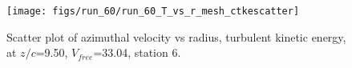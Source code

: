 \begin{figure}[H]
\centering
\texttt{[image: figs/run\_60/run\_60\_T\_vs\_r\_mesh\_ctkescatter]}
\caption{Scatter plot of azimuthal velocity vs radius, turbulent kinetic energy, at $z/c$=9.50, $V_{free}$=33.04, station 6.}
\label{fig:run_60_T_vs_r_mesh_ctkescatter}
\end{figure}


